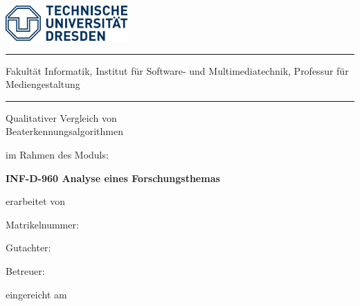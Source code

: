 \makeatletter
\begin{titlepage}
	\RaggedRight
	\includegraphics[width=0.35\textwidth]{resources/logoTUD.png}\par\vspace{0cm}
	\noindent\rule{\textwidth}{0.4pt}
	{\normalfont\mdseries\small\sffamily Fakultät Informatik,}
	{\normalfont\mdseries\small\sffamily Institut für Software- und Multimediatechnik, Professur für Mediengestaltung}
	\vspace{2mm}\noindent\hrule
	\vspace{3cm}
	{\normalfont\Large \thesistype \par}
	\vspace{1cm}
	{\normalfont\Huge\mdseries\sffamily Qualitativer Vergleich von \\ Beaterkennungsalgorithmen\par}
	\vspace{1.5cm}
	{\normalfont\large im Rahmen des Moduls:\par}
	{\normalfont\Large\bfseries INF-D-960 Analyse eines Forschungsthemas \par}
	\vspace{1cm}
	{\sffamily\large\mdseries erarbeitet von\par}
	\vspace{1.5mm}
	{\normalfont\Large \@author\par}
	\vspace{0.5mm}
	{\normalfont\large Matrikelnummer: \matnr \par}
	\vspace{2.0cm}
	{\sffamily\large Gutachter:\par}
    \vspace{1mm}
	{\normalfont\large \gutachter \par}
	\vspace{7mm}
	{\sffamily\large Betreuer:\par}
	\vspace{0.7mm}
	{\normalfont\large \betreuer \par}
	\vspace{1cm}
	{\sffamily\large\mdseries eingereicht am\par}
	\vspace{1mm}
	{\normalfont\normalsize \@date \par}
\end{titlepage}
\makeatother
